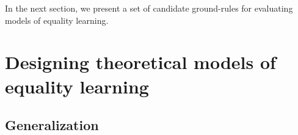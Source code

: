 \documentclass[9pt,twocolumn,twoside,lineno]{pnas-new}
\newcommand{\figref}[1]{Figure~\ref{#1}}
\newcommand{\updateb}[1]{{\color{ourgreen}#1}}
\begin{document}
%


\updateb{In the next section, we present a set of candidate ground-rules for evaluating models of equality learning.}


\section*{Designing theoretical models of equality learning}


\subsection*{Generalization}
\end{document}
